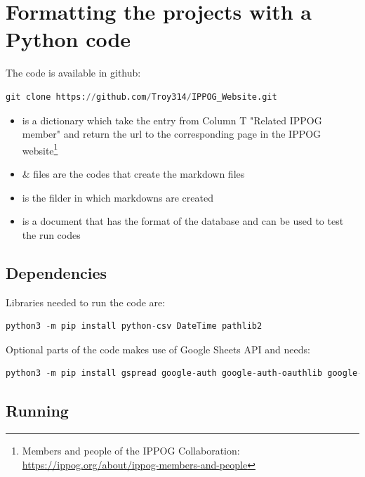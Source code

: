 \section{Formatting the projects with a Python code}\label{sec:Python}

The code is available in github: 
\begin{lstlisting}[language=Python]
    git clone https://github.com/Troy314/IPPOG_Website.git
\end{lstlisting}

\begin{itemize}
    \item {} is a dictionary which take the entry from Column T "Related IPPOG member" and return the url to the corresponding page in the IPPOG website\footnote{Members and people of the IPPOG Collaboration: \href{https://ippog.org/about/ippog-members-and-people}{https://ippog.org/about/ippog-members-and-people}}
    \item {} \&  files are the codes that create the markdown files
    \item {} is the filder in which markdowns are created
    \item {} is a document that has the format of the database and can be used to test the run codes 
\end{itemize}

\subsection{Dependencies}\label{dependencies}

Libraries needed to run the code are: 

\begin{lstlisting}[language=Python]
    python3 -m pip install python-csv DateTime pathlib2
\end{lstlisting}

Optional parts of the code makes use of Google Sheets API and needs:

\begin{lstlisting}[language=Python]
    python3 -m pip install gspread google-auth google-auth-oauthlib google-auth-httplib2
\end{lstlisting}

\subsection{Running}

